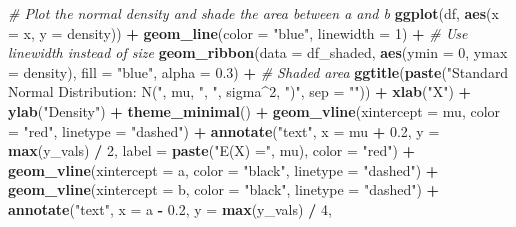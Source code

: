 \documentclass[
]{book}
\newenvironment{Shaded}{\begin{snugshade}}{\end{snugshade}}
\newcommand{\AttributeTok}[1]{\textcolor[rgb]{0.13,0.29,0.53}{#1}}
\newcommand{\CommentTok}[1]{\textcolor[rgb]{0.56,0.35,0.01}{\textit{#1}}}
\newcommand{\DecValTok}[1]{\textcolor[rgb]{0.00,0.00,0.81}{#1}}
\newcommand{\FloatTok}[1]{\textcolor[rgb]{0.00,0.00,0.81}{#1}}
\newcommand{\FunctionTok}[1]{\textcolor[rgb]{0.13,0.29,0.53}{\textbf{#1}}}
\newcommand{\NormalTok}[1]{#1}
\newcommand{\SpecialCharTok}[1]{\textcolor[rgb]{0.81,0.36,0.00}{\textbf{#1}}}
\newcommand{\StringTok}[1]{\textcolor[rgb]{0.31,0.60,0.02}{#1}}
\begin{document}
\begin{Shaded}
\begin{Highlighting}[]
\CommentTok{\# Plot the normal density and shade the area between a and b}
\FunctionTok{ggplot}\NormalTok{(df, }\FunctionTok{aes}\NormalTok{(}\AttributeTok{x =}\NormalTok{ x, }\AttributeTok{y =}\NormalTok{ density)) }\SpecialCharTok{+}
  \FunctionTok{geom\_line}\NormalTok{(}\AttributeTok{color =} \StringTok{"blue"}\NormalTok{, }\AttributeTok{linewidth =} \DecValTok{1}\NormalTok{) }\SpecialCharTok{+}  \CommentTok{\# Use linewidth instead of size}
  \FunctionTok{geom\_ribbon}\NormalTok{(}\AttributeTok{data =}\NormalTok{ df\_shaded, }\FunctionTok{aes}\NormalTok{(}\AttributeTok{ymin =} \DecValTok{0}\NormalTok{, }\AttributeTok{ymax =}\NormalTok{ density),}
              \AttributeTok{fill =} \StringTok{"blue"}\NormalTok{, }\AttributeTok{alpha =} \FloatTok{0.3}\NormalTok{) }\SpecialCharTok{+}  \CommentTok{\# Shaded area}
  \FunctionTok{ggtitle}\NormalTok{(}\FunctionTok{paste}\NormalTok{(}\StringTok{"Standard Normal Distribution: }
\StringTok{  N("}\NormalTok{, mu, }\StringTok{", "}\NormalTok{, sigma}\SpecialCharTok{\^{}}\DecValTok{2}\NormalTok{, }\StringTok{")"}\NormalTok{, }\AttributeTok{sep =} \StringTok{""}\NormalTok{)) }\SpecialCharTok{+}
  \FunctionTok{xlab}\NormalTok{(}\StringTok{"X"}\NormalTok{) }\SpecialCharTok{+}
  \FunctionTok{ylab}\NormalTok{(}\StringTok{"Density"}\NormalTok{) }\SpecialCharTok{+}
  \FunctionTok{theme\_minimal}\NormalTok{() }\SpecialCharTok{+}
  \FunctionTok{geom\_vline}\NormalTok{(}\AttributeTok{xintercept =}\NormalTok{ mu, }\AttributeTok{color =} \StringTok{"red"}\NormalTok{, }\AttributeTok{linetype =} \StringTok{"dashed"}\NormalTok{) }\SpecialCharTok{+}
  \FunctionTok{annotate}\NormalTok{(}\StringTok{"text"}\NormalTok{, }\AttributeTok{x =}\NormalTok{ mu }\SpecialCharTok{+} \FloatTok{0.2}\NormalTok{, }\AttributeTok{y =} \FunctionTok{max}\NormalTok{(y\_vals) }\SpecialCharTok{/} \DecValTok{2}\NormalTok{,}
           \AttributeTok{label =} \FunctionTok{paste}\NormalTok{(}\StringTok{"E(X) ="}\NormalTok{, mu), }\AttributeTok{color =} \StringTok{"red"}\NormalTok{) }\SpecialCharTok{+}
  \FunctionTok{geom\_vline}\NormalTok{(}\AttributeTok{xintercept =}\NormalTok{ a, }\AttributeTok{color =} \StringTok{"black"}\NormalTok{, }\AttributeTok{linetype =} \StringTok{"dashed"}\NormalTok{) }\SpecialCharTok{+}
  \FunctionTok{geom\_vline}\NormalTok{(}\AttributeTok{xintercept =}\NormalTok{ b, }\AttributeTok{color =} \StringTok{"black"}\NormalTok{, }\AttributeTok{linetype =} \StringTok{"dashed"}\NormalTok{) }\SpecialCharTok{+}
  \FunctionTok{annotate}\NormalTok{(}\StringTok{"text"}\NormalTok{, }\AttributeTok{x =}\NormalTok{ a }\SpecialCharTok{{-}} \FloatTok{0.2}\NormalTok{, }\AttributeTok{y =} \FunctionTok{max}\NormalTok{(y\_vals) }\SpecialCharTok{/} \DecValTok{4}\NormalTok{,}

\end{Highlighting}
\end{Shaded}
\end{document}

